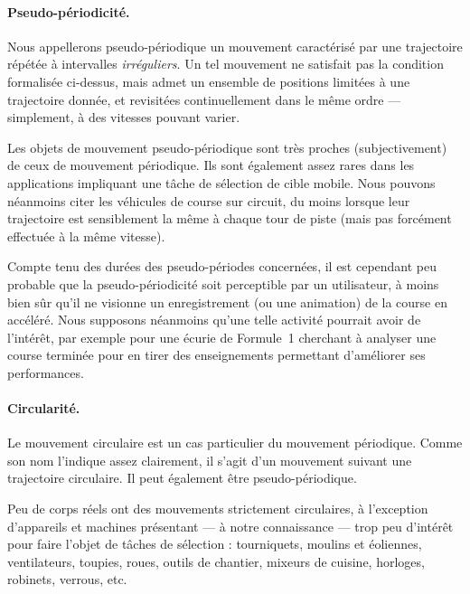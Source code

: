 	
	\paragraph{Pseudo-périodicité.}
	Nous appellerons pseudo-périodique un mouvement caractérisé par une trajectoire répétée à intervalles \emph{irréguliers}. Un tel mouvement ne satisfait pas la condition formalisée ci-dessus, mais admet un ensemble de positions limitées à une trajectoire donnée, et revisitées continuellement dans le même ordre --- simplement, à des vitesses pouvant varier.
	
	Les objets de mouvement pseudo-périodique sont très proches (subjectivement) de ceux de mouvement périodique. Ils sont également assez rares dans les applications impliquant une tâche de sélection de cible mobile. Nous pouvons néanmoins citer les véhicules de course sur circuit, du moins lorsque leur trajectoire est sensiblement la même à chaque tour de piste (mais pas forcément effectuée à la même vitesse).
	
	Compte tenu des durées des pseudo-périodes concernées, il est cependant peu probable que la pseudo-périodicité soit perceptible par un utilisateur, à moins bien sûr qu'il ne visionne un enregistrement (ou une animation) de la course en accéléré. Nous supposons néanmoins qu'une telle activité pourrait avoir de l'intérêt, par exemple pour une écurie de Formule~1 cherchant à analyser une course terminée pour en tirer des enseignements permettant d'améliorer ses performances.

	\paragraph{Circularité.}
	Le mouvement circulaire est un cas particulier du mouvement périodique. Comme son nom l'indique assez clairement, il s'agit d'un mouvement suivant une trajectoire circulaire. Il peut également être pseudo-périodique.
	
	Peu de corps réels ont des mouvements strictement circulaires, à l'exception d'appareils et machines présentant --- à notre connaissance --- trop peu d'intérêt pour faire l'objet de tâches de sélection : tourniquets, moulins et éoliennes, ventilateurs, toupies, roues, outils de chantier, mixeurs de cuisine, horloges, robinets, verrous, etc.
	
